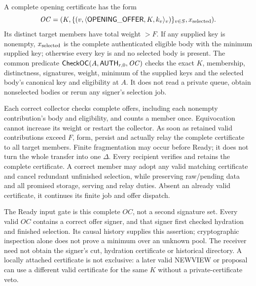 \begin{definition}
\label{def:opening-certificate}
A complete opening certificate has the form
\[
 \mathit{OC}=(K,\{(v,\langle\mathsf{OPENING\_OFFER},K,k_v\rangle_v)\}_{v\in S},
                x_{\rm selected}).
\]
Its distinct target members have total weight $>F$. If any supplied key
is nonempty, $x_{\rm selected}$ is the complete authenticated eligible
body with the minimum supplied key; otherwise every key is 
and no selected body is present. The common predicate
$\mathsf{CheckOC}(A,\mathsf{AUTH}_{r,0},\mathit{OC})$ checks the exact $K$,
membership, distinctness, signatures, weight, minimum of the supplied
keys and the selected body's canonical key and eligibility at $A$.
It does not read a private queue, obtain nonselected bodies or rerun
any signer's selection job.
\end{definition}

Each correct collector checks complete offers, including each nonempty
contribution's body and eligibility, and counts a member once.
Equivocation cannot increase its weight or restart the collector.
As soon as retained valid contributions exceed $F$, form, persist and
actually relay the complete certificate to all target members. Finite
fragmentation may occur before Ready; it does not turn the whole
transfer into one $\Delta$. Every recipient verifies and retains the
complete certificate. A correct member may adopt any valid matching
certificate and cancel redundant unfinished selection, while preserving
raw/pending data and all promised storage, serving and relay duties.
Absent an already valid certificate, it continues its finite job and
offer dispatch.

The Ready input gate is this complete $\mathit{OC}$, not a second
 signature set. Every valid $\mathit{OC}$ contains a correct
offer signer, and that signer first checked hydration and finished
selection. Its causal history supplies this assertion; cryptographic
inspection alone does not prove a minimum over an unknown pool. The
receiver need not obtain the signer's cut, hydration certificate or
historical directory. A locally attached certificate is not exclusive:
a later valid NEWVIEW or proposal can use a different valid certificate
for the same $K$ without a private-certificate veto.

